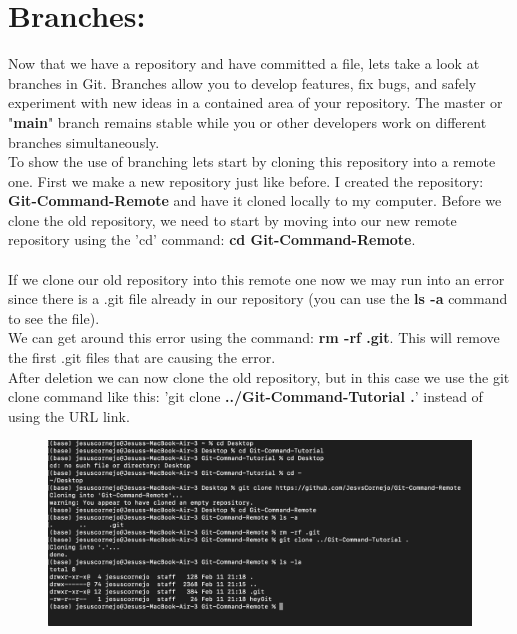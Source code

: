 \documentclass{article}
\begin{document}
\newpage

\section{Branches:}
Now that we have a repository and have committed a file, lets take a look at branches in Git. Branches allow you to develop features, fix bugs, and safely experiment with new ideas in a contained area of your repository. The master or "\textbf{main}" branch remains stable while you or other developers work on different branches simultaneously.\\
To show the use of branching lets start by cloning this repository into a remote one. First we make a new repository just like before. I created the repository: \textbf{Git-Command-Remote} and have it cloned locally to my computer. Before we clone the old repository, we need to start by moving into our new remote repository using the 'cd' command: \textbf{cd Git-Command-Remote}.\\ \\
If we clone our old repository into this remote one now we may run into an error since there is a .git file already in our repository (you can use the \textbf{ls -a} command to see the file).\\
We can get around this error using the command: \textbf{rm -rf .git}. This will remove the first .git files that are causing the error. \\
After deletion we can now clone the old repository, but in this case we use the git clone command like this: 'git clone \textbf{../Git-Command-Tutorial .}' instead of using the URL link. 

\begin{figure}[h]
\includegraphics[scale = 0.6]{screenshots/sc7.png}
\centering
\end{figure} 
\end{document}
